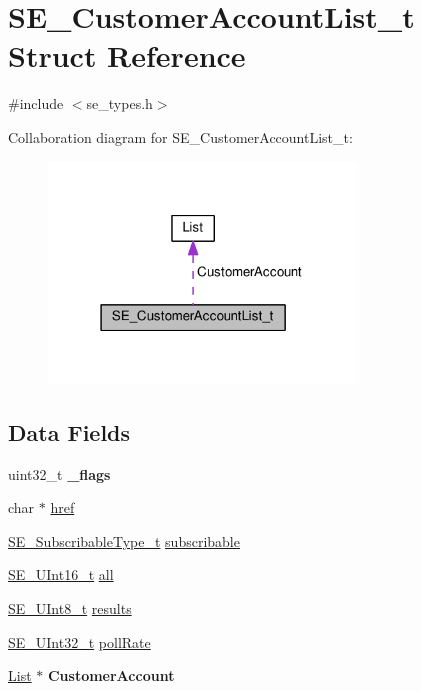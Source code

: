 \hypertarget{structSE__CustomerAccountList__t}{}\section{S\+E\+\_\+\+Customer\+Account\+List\+\_\+t Struct Reference}
\label{structSE__CustomerAccountList__t}


{\ttfamily \#include $<$se\+\_\+types.\+h$>$}



Collaboration diagram for S\+E\+\_\+\+Customer\+Account\+List\+\_\+t\+:\nopagebreak
\begin{figure}[H]
\begin{center}
\leavevmode
\includegraphics[width=231pt]{structSE__CustomerAccountList__t__coll__graph}
\end{center}
\end{figure}
\subsection*{Data Fields}
\begin{DoxyCompactItemize}
\item 
uint32\+\_\+t {\bfseries \+\_\+flags}
\item 
char $\ast$ \hyperlink{group__CustomerAccountList_ga779dd7f5cc9226f54bb2c7c42171888e}{href}
\item 
\hyperlink{group__SubscribableType_ga5c41f553d369710ed34619266bf2551e}{S\+E\+\_\+\+Subscribable\+Type\+\_\+t} \hyperlink{group__CustomerAccountList_gaafec7bb1c828eb363b95a717027c419b}{subscribable}
\item 
\hyperlink{group__UInt16_gac68d541f189538bfd30cfaa712d20d29}{S\+E\+\_\+\+U\+Int16\+\_\+t} \hyperlink{group__CustomerAccountList_ga0257b81e21595473abdcc5596b175974}{all}
\item 
\hyperlink{group__UInt8_gaf7c365a1acfe204e3a67c16ed44572f5}{S\+E\+\_\+\+U\+Int8\+\_\+t} \hyperlink{group__CustomerAccountList_ga1e4789516b3787f1600934507472afe7}{results}
\item 
\hyperlink{group__UInt32_ga70bd4ecda3c0c85d20779d685a270cdb}{S\+E\+\_\+\+U\+Int32\+\_\+t} \hyperlink{group__CustomerAccountList_ga1ecc993e58dc2d5bb1e4ce5cb31b54e0}{poll\+Rate}
\item 
\hyperlink{structList}{List} $\ast$ {\bfseries Customer\+Account}
\end{DoxyCompactItemize}


